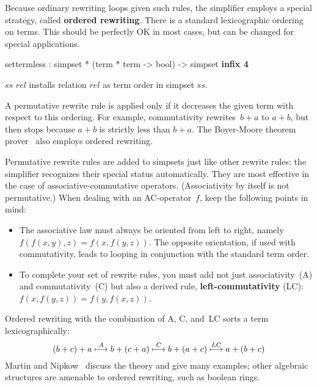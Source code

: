 Because ordinary rewriting loops given such rules, the simplifier
employs a special strategy, called {\bf ordered
  rewriting}.  There is a standard
lexicographic ordering on terms.  This should be perfectly OK in most
cases, but can be changed for special applications.

\begin{ttbox}
settermless : simpset * (term * term -> bool) -> simpset \hfill{\bf infix 4}
\end{ttbox}
\begin{ttdescription}
  
\item[$ss$ \ttindexbold{settermless} $rel$] installs relation $rel$ as
  term order in simpset $ss$.

\end{ttdescription}

\medskip

A permutative rewrite rule is applied only if it decreases the given
term with respect to this ordering.  For example, commutativity
rewrites~$b+a$ to $a+b$, but then stops because $a+b$ is strictly less
than $b+a$.  The Boyer-Moore theorem prover~\cite{bm88book} also
employs ordered rewriting.

Permutative rewrite rules are added to simpsets just like other
rewrite rules; the simplifier recognizes their special status
automatically.  They are most effective in the case of
associative-commutative operators.  (Associativity by itself is not
permutative.)  When dealing with an AC-operator~$f$, keep the
following points in mind:
\begin{itemize}
  
\item The associative law must always be oriented from left to right,
  namely $f(f(x,y),z) = f(x,f(y,z))$.  The opposite orientation, if
  used with commutativity, leads to looping in conjunction with the
  standard term order.

\item To complete your set of rewrite rules, you must add not just
  associativity~(A) and commutativity~(C) but also a derived rule, {\bf
    left-com\-mut\-ativ\-ity} (LC): $f(x,f(y,z)) = f(y,f(x,z))$.
\end{itemize}
Ordered rewriting with the combination of A, C, and~LC sorts a term
lexicographically:
\[\def\maps#1{\stackrel{#1}{\longmapsto}}
 (b+c)+a \maps{A} b+(c+a) \maps{C} b+(a+c) \maps{LC} a+(b+c) \]
Martin and Nipkow~\cite{martin-nipkow} discuss the theory and give many
examples; other algebraic structures are amenable to ordered rewriting,
such as boolean rings.


